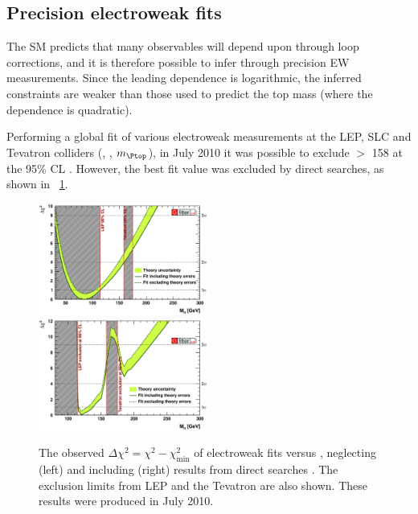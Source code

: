 \subsection{Precision electroweak fits}
\label{sec:prior_constraints:ew_fits}

The SM predicts that many observables will depend upon \mH through loop corrections,
and it is therefore possible to infer \mH through precision EW measurements. Since 
the leading \mH dependence is logarithmic, the inferred constraints are weaker than those
used to predict the top mass (where the dependence is quadratic).

Performing a global fit of various electroweak measurements at the LEP, SLC and
Tevatron colliders (\eg \mW, \mZ, $m_{\Ptop}$), in July 2010 it was possible to exclude 
\mH $>$ \unit{158}{\GeV} at the 95\% CL \cite{Gfitter:2008}. However, the best fit 
value was excluded by direct searches, as shown in \Figure~\ref{fig:ewfit}.

\begin{figure}
	\includegraphics[width=0.495\textwidth]{tex/motivation/ewfit_nodirect}
	\hfill
	\includegraphics[width=0.495\textwidth]{tex/motivation/ewfit_withdirect}
	\caption{The observed $\Delta\chi^2 = \chi^2 - \chi^2_{\min}$ of electroweak fits 
	versus \mH, neglecting (left) and including (right) results from direct searches
	\cite{Gfitter:2008}. The exclusion limits from LEP and the Tevatron are also shown.
	These results were produced in July 2010.}
	\label{fig:ewfit}
\end{figure}

